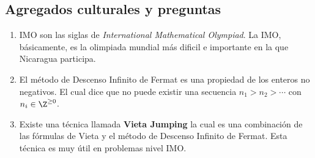 \subsection{Agregados culturales y preguntas}
{
    \begin{enumerate}
        \item IMO son las siglas de \textit{International Mathematical Olympiad}. La IMO, básicamente, es la olimpiada mundial más dificil e importante en la que Nicaragua participa.
        \item El método de Descenso Infinito de Fermat es una propiedad de los enteros no negativos. El cual dice que no puede existir una secuencia $n_1 > n_2 > \cdots$ con $n_i \in \Z^{\geq 0}$.
        \item Existe una técnica llamada \textbf{Vieta Jumping} la cual es una combinación de las fórmulas de Vieta y el método de Descenso Infinito de Fermat.
        Esta técnica es muy útil en problemas nivel IMO.
    \end{enumerate}
}\label{subsec:agregados-culturales}


